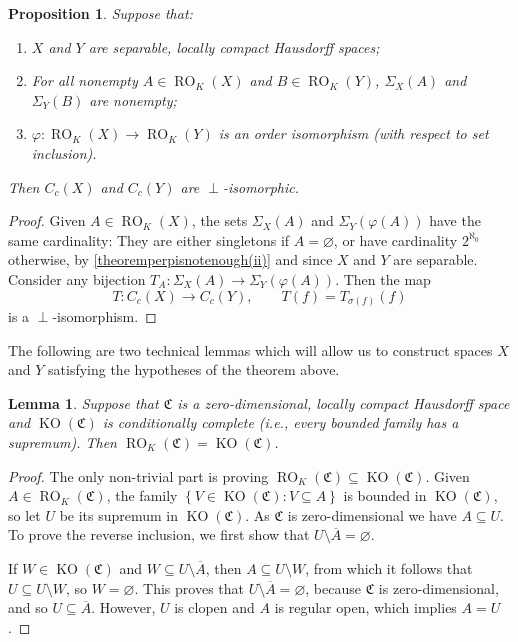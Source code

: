 \documentclass[letter,11pt]{amsart}
\theoremstyle{plain}		\newtheorem{theorem}[generalnumbering]{Theorem}
\theoremstyle{plain}		\newtheorem{corollary}[generalnumbering]{Corollary}
\theoremstyle{definition}		\newtheorem{definition}[generalnumbering]{Definition}
\theoremstyle{definition}		\newtheorem{example}[generalnumbering]{Example}
\theoremstyle{plain}		\newtheorem{proposition}[generalnumbering]{Proposition}
\theoremstyle{plain}		\newtheorem{lemma}[generalnumbering]{Lemma}
\theoremstyle{plain}    \newtheorem{plainstyle}[generalnumbering]{\namefordifferentenvironment}
\theoremstyle{plain}    \newtheorem*{plainstyle*}{\namefordifferentenvironment}
\theoremstyle{definition}    \newtheorem{definitionstyle}[generalnumbering]{\namefordifferentenvironment}
\theoremstyle{definition}    \newtheorem*{definitionstyle*}{\namefordifferentenvironment}
\begin{document}
\begin{proposition}\label{propositionperpisnotenough}
	Suppose that:
	\begin{enumerate}[label=(\roman*)]
		\item\label{theoremperpisnotenough(i)} $X$ and $Y$ are separable, locally compact Hausdorff spaces;
		\item\label{theoremperpisnotenough(ii)} For all nonempty $A\in\operatorname{RO}_K(X)$ and $B\in\operatorname{RO}_K(Y)$, $\Sigma_X(A)$ and $\Sigma_Y(B)$ are nonempty;
		\item\label{theoremperpisnotenough(iii)} $\varphi\colon\operatorname{RO}_K(X)\to\operatorname{RO}_K(Y)$ is an order isomorphism (with respect to set inclusion).
	\end{enumerate}
	Then $C_c(X)$ and $C_c(Y)$ are $\perp$-isomorphic.
\end{proposition}
\begin{proof}
	Given $A\in\operatorname{RO}_K(X)$, the sets  $\Sigma_X(A)$ and $\Sigma_Y(\varphi(A))$ have the same cardinality: They are either singletons if $A=\varnothing$, or have cardinality $2^{\aleph_0}$ otherwise, by \ref{theoremperpisnotenough(ii)} and since $X$ and $Y$ are separable. Consider any bijection $T_A\colon\Sigma_X(A)\to\Sigma_Y(\varphi(A))$. Then the map
	\[T\colon C_c(X)\to C_c(Y),\qquad T(f)=T_{\sigma(f)}(f)\]
	is a $\perp$-isomorphism.\qedhere
\end{proof}

The following are two technical lemmas which will allow us to construct spaces $X$ and $Y$ satisfying the hypotheses of the theorem above.

\begin{lemma}\label{lemmawhenregularcompactopenareclopen}
	Suppose that $\mathfrak{C}$ is a zero-dimensional, locally compact Hausdorff space and $\operatorname{KO}(\mathfrak{C})$ is conditionally complete (i.e., every \emph{bounded} family has a supremum). Then $\operatorname{RO}_K(\mathfrak{C})=\operatorname{KO}(\mathfrak{C})$.
\end{lemma}
\begin{proof}
	The only non-trivial part is proving $\operatorname{RO}_K(\mathfrak{C})\subseteq\operatorname{KO}(\mathfrak{C})$. Given $A\in\operatorname{RO}_K(\mathfrak{C})$, the family $\left\{V\in\operatorname{KO}(\mathfrak{C}):V\subseteq A\right\}$ is bounded in $\operatorname{KO}(\mathfrak{C})$, so let $U$ be its supremum in $\operatorname{KO}(\mathfrak{C})$. As $\mathfrak{C}$ is zero-dimensional we have $A\subseteq U$. To prove the reverse inclusion, we first show that $U\setminus\overline{A}=\varnothing$.
	
	If $W\in\operatorname{KO}(\mathfrak{C})$ and $W\subseteq U\setminus\overline{A}$, then $A\subseteq  U\setminus W$, from which it follows that $U\subseteq U\setminus W$, so $W=\varnothing$. This proves that $U\setminus\overline{A}=\varnothing$, because $\mathfrak{C}$ is zero-dimensional, and so $U\subseteq\overline{A}$. However, $U$ is clopen and $A$ is regular open, which implies $A=U$.\qedhere
\end{proof}
\end{document}
